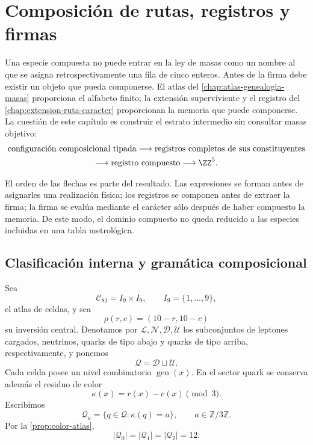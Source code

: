 \chapter{Composición de rutas, registros y firmas}
\label{chap:composicion-especies-rev6}

Una especie compuesta no puede entrar en la ley de masas como un nombre al
que se asigna retrospectivamente una fila de cinco enteros. Antes de la firma
debe existir un objeto que pueda componerse. El atlas del
\cref{chap:atlas-genealogia-masas} proporciona el alfabeto finito; la
extensión superviviente y el registro del
\cref{chap:extension-ruta-caracter} proporcionan la memoria que puede
componerse. La cuestión de este capítulo es construir el estrato intermedio
sin consultar masas objetivo:
\[
\begin{gathered}
 \text{configuración composicional tipada}
 \longrightarrow
 \text{registros completos de sus constituyentes}\\
 \longrightarrow
 \text{registro compuesto}
 \longrightarrow
 \ZZ^5.
\end{gathered}
\]

El orden de las flechas es parte del resultado. Las expresiones se forman
antes de asignarles una realización física; los registros se componen antes
de extraer la firma; la firma se evalúa mediante el carácter sólo después de
haber compuesto la memoria. De este modo, el dominio compuesto no queda
reducido a las especies incluidas en una tabla metrológica.

\section{Clasificación interna y gramática composicional}
\label{sec:alfabeto-composicional-rev6}

Sea
\[
 \mathcal C_{81}=I_9\times I_9,
 \qquad I_9=\{1,\ldots,9\},
\]
el atlas de celdas, y sea
\[
 \rho(r,c)=(10-r,10-c)
\]
su inversión central. Denotamos por
\(\mathcal L,\mathcal N,\mathcal D,\mathcal U\) los subconjuntos de
leptones cargados, neutrinos, quarks de tipo abajo y quarks de tipo arriba,
respectivamente, y ponemos
\[
 \mathcal Q=\mathcal D\sqcup\mathcal U.
\]
Cada celda posee un nivel combinatorio
\(\operatorname{gen}(x)\). En el sector quark se conserva además el residuo
de color
\[
 \kappa(x)=r(x)-c(x)\pmod3.
\]
Escribimos
\[
 \mathcal Q_a=\{q\in\mathcal Q:\kappa(q)=a\},
 \qquad a\in\mathbb Z/3\mathbb Z.
\]
Por la \cref{prop:color-atlas},
\[
 |\mathcal Q_0|=|\mathcal Q_1|=|\mathcal Q_2|=12.
\]

